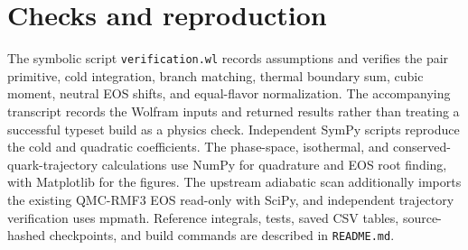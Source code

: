 \section{Checks and reproduction}
\label{app:verification}
The symbolic script \texttt{verification.wl} records assumptions and verifies the pair primitive, cold integration, branch matching, thermal boundary sum, cubic moment, neutral EOS shifts, and equal-flavor normalization.
The accompanying transcript records the Wolfram inputs and returned results rather than treating a successful typeset build as a physics check.
Independent SymPy scripts reproduce the cold and quadratic coefficients.
The phase-space, isothermal, and conserved-quark-trajectory calculations use NumPy for quadrature and EOS root finding, with Matplotlib for the figures.
The upstream adiabatic scan additionally imports the existing QMC-RMF3 EOS read-only with SciPy, and independent trajectory verification uses mpmath.
Reference integrals, tests, saved CSV tables, source-hashed checkpoints, and build commands are described in \texttt{README.md}.
